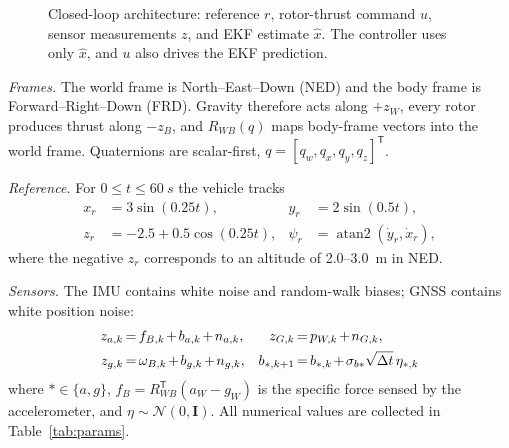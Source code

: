 \documentclass[conference]{IEEEtran}
\newcommand{\T}{^{\mathsf T}}
\newcommand{\I}{\mathbf I}
\begin{document}
\begin{figure}[!b]
\centering
{}
\caption{Closed-loop architecture: reference $r$, rotor-thrust command $u$, sensor measurements $z$, and EKF estimate $\hat x$. The controller uses only $\hat x$, and $u$ also drives the EKF prediction.}
\label{fig:arch}
\end{figure}

\textit{Frames.} The world frame is North--East--Down (NED) and the body frame is Forward--Right--Down (FRD). Gravity therefore acts along $+z_W$, every rotor produces thrust along $-z_B$, and $R_{WB}(q)$ maps body-frame vectors into the world frame. Quaternions are scalar-first, $q=[q_w,q_x,q_y,q_z]\T$.

\textit{Reference.} For $0\le t\le\SI{60}{s}$ the vehicle tracks
\begin{equation}
\begin{aligned}
x_r&=3\sin(0.25t), & y_r&=2\sin(0.5t),\\
z_r&=-2.5+0.5\cos(0.25t), & \psi_r&=\operatorname{atan2}(\dot y_r,\dot x_r),
\end{aligned}
\label{eq:reference}
\end{equation}
where the negative $z_r$ corresponds to an altitude of 2.0--3.0~m in NED.

\textit{Sensors.} The IMU contains white noise and random-walk biases; GNSS contains white position noise:
\begin{equation}\setlength{\arraycolsep}{0pt}\medmuskip=2mu\thickmuskip=3mu
\begin{aligned}
z_{a,k}&=f_{B,k}+b_{a,k}+n_{a,k}, & z_{G,k}&=p_{W,k}+n_{G,k},\\
z_{g,k}&=\omega_{B,k}+b_{g,k}+n_{g,k}, & b_{\ast,k+1}&=b_{\ast,k}+\sigma_{b\ast}\sqrt{\Delta t}\,\eta_{\ast,k}
\end{aligned}
\label{eq:sensors}
\end{equation}
where $\ast\in\{a,g\}$, $f_B=R_{WB}\T(a_W-g_W)$ is the specific force sensed by the accelerometer, and $\eta\sim\mathcal N(0,\I)$. All numerical values are collected in Table~\ref{tab:params}.
\end{document}
